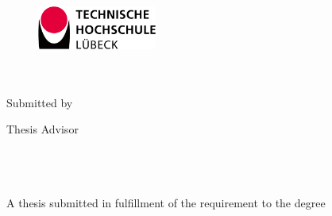 
\frontmatter %
\pagestyle{plain} %


\begin{titlepage}
\begin{center}

\begin{figure}
\centering
\includegraphics[width=0.35\textwidth]{Figures/Logo_TH_Luebeck_new}
\end{figure}

 \hfill\break\\[0cm]
 
{\LARGE \bfseries \ttitle}\\[1.5cm] %


Submitted by\\[0.5cm]
\authorname %

\vspace{2.3em}

Thesis Advisor\\[0.5cm]
\supname %
 
\vspace{2.3em} 
\textsc{
\programname\\
\pillarname\\
\universityname}\\[1.5cm] %
 
{A thesis submitted in fulfillment of the requirement to the degree\\\degreename}\\[1.7cm] %

 
\the\year{}\\ %

\vfill
\end{center}
\end{titlepage}

